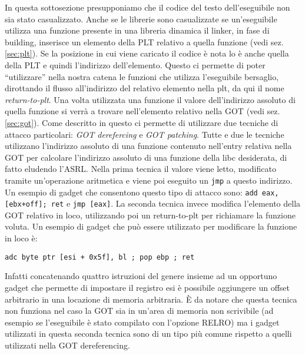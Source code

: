 In questa sottosezione presupponiamo che il codice del testo
dell'eseguibile non sia stato casualizzato. Anche se le librerie sono
casualizzate se un'eseguibile utilizza una funzione presente in una
libreria dinamica il linker, in fase di building, inserisce un
elemento della PLT relativo a quella funzione (vedi
sez. \ref{sec:plt}). Se la posizione in cui viene caricato il codice è
nota lo è anche quella della PLT e quindi l'indirizzo
dell'elemento. Questo ci permette di poter ``utilizzare'' nella nostra
catena le funzioni che utilizza l'eseguibile bersaglio, dirottando il
flusso all'indirizzo del relativo elemento nella plt, da qui il nome
\emph{return-to-plt}. Una volta utilizzata una funzione il valore
dell'indirizzo assoluto di quella funzione si verrà a trovare
nell'elemento relativo nella GOT (vedi sez. \ref{sec:got}). Come
descritto in \cite{roglia:2009} questo ci permette di utilizzare due
tecniche di attacco particolari: \emph{GOT derefercing} e \emph{GOT
  patching}. Tutte e due le tecniche utilizzano l'indirizzo assoluto
di una funzione contenuto nell'entry relativa nella GOT per calcolare
l'indirizzo assoluto di una funzione della libc desiderata, di fatto
eludendo l'ASRL. Nella prima tecnica il valore viene letto, modificato
tramite un'operazione aritmetica e viene poi eseguito un
\lstinline{jmp} a questo indirizzo. Un esempio di gadget che
consentono questo tipo di attacco sono: \lstinline{add eax, [ebx+off]; ret} e \lstinline{jmp [eax]}. La seconda tecnica invece
modifica l'elemento della GOT relativo in loco, utilizzando poi un
return-to-plt per richiamare la funzione voluta. Un esempio di gadget
che può essere utilizzato per modificare la funzione in loco è:

\lstinline{adc byte ptr [esi + 0x5f], bl ; pop ebp ; ret}

Infatti concatenando quattro istruzioni del genere insieme ad un
opportuno gadget che permette di impostare il registro esi è possibile
aggiungere un offset arbitrario in una locazione di memoria
arbitraria. È da notare che questa tecnica non funziona nel caso la
GOT sia in un'area di memoria non scrivibile (ad esempio se
l'eseguibile è stato compilato con l'opzione RELRO) ma i gadget
utilizzati in questa seconda tecnica sono di un tipo più comune
rispetto a quelli utilizzati nella GOT dereferencing.


